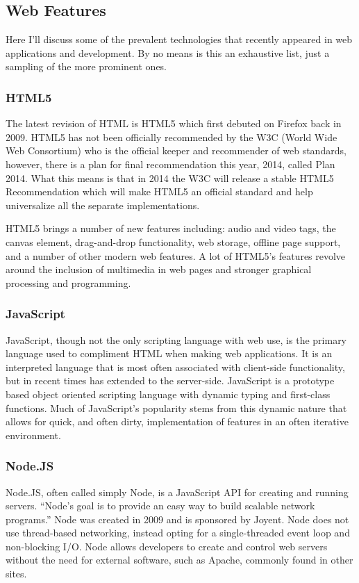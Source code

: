 \documentclass[11pt]{article}
\begin{document}
\subsection{Web Features}
Here I'll discuss some of the prevalent technologies that recently appeared in web applications and development. By no means is this an exhaustive list, just a sampling of the more prominent ones.

\subsubsection{HTML5}
The latest revision of HTML is HTML5 which first debuted on Firefox back in 2009. \cite{EvolutionOfWeb} HTML5 has not been officially recommended by the W3C (World Wide Web Consortium) who is the official keeper and recommender of web standards, however, there is a plan for final recommendation this year, 2014, called Plan 2014. \cite{Plan2014} What this means is that in 2014 the W3C will release a stable HTML5 Recommendation which will make HTML5 an official standard and help universalize all the separate implementations.

HTML5 brings a number of new features including: audio and video tags, the canvas element, drag-and-drop functionality, web storage, offline page support, and a number of other modern web features. A lot of HTML5's features revolve around the inclusion of multimedia in web pages and stronger graphical processing and programming.

\subsubsection{JavaScript}
JavaScript, though not the only scripting language with web use, is the primary language used to compliment HTML when making web applications. It is an interpreted language that is most often associated with client-side functionality, but in recent times has extended to the server-side. JavaScript is a prototype based object oriented scripting language with dynamic typing and first-class functions. Much of JavaScript's popularity stems from this dynamic nature that allows for quick, and often dirty, implementation of features in an often iterative environment.

\subsubsection{Node.JS}
Node.JS, often called simply Node, is a JavaScript API for creating and running servers. ``Node's goal is to provide an easy way to build scalable network programs.'' \cite{Node} Node was created in 2009 and is sponsored by Joyent. Node does not use thread-based networking, instead opting for a single-threaded event loop and non-blocking I/O. Node allows developers to create and control web servers without the need for external software, such as Apache, commonly found in other sites.
\end{document}
